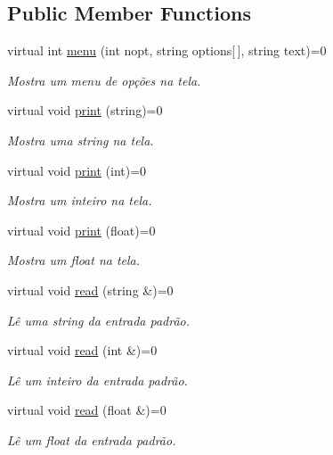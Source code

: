 \subsection*{Public Member Functions}
\begin{DoxyCompactItemize}
\item 
virtual int \hyperlink{classWindow_a3b6d7449c7f088f9ce59002573ca82c0}{menu} (int nopt, string options\mbox{[}$\,$\mbox{]}, string text)=0
\begin{DoxyCompactList}\small\item\em Mostra um menu de opções na tela. \end{DoxyCompactList}\item 
virtual void \hyperlink{classWindow_a4fd86bca046073b3429f221c2f3bb690}{print} (string)=0
\begin{DoxyCompactList}\small\item\em Mostra uma string na tela. \end{DoxyCompactList}\item 
virtual void \hyperlink{classWindow_aa0a1210e72a63332e49722f1f878ea94}{print} (int)=0
\begin{DoxyCompactList}\small\item\em Mostra um inteiro na tela. \end{DoxyCompactList}\item 
virtual void \hyperlink{classWindow_a08f0e967158988de3cf9eb08a7823585}{print} (float)=0
\begin{DoxyCompactList}\small\item\em Mostra um float na tela. \end{DoxyCompactList}\item 
virtual void \hyperlink{classWindow_abb59602c637907250fd70b1450b85c5c}{read} (string \&)=0
\begin{DoxyCompactList}\small\item\em Lê uma string da entrada padrão. \end{DoxyCompactList}\item 
virtual void \hyperlink{classWindow_ab00a4c057aade6ddc2a4bb22b2a6de42}{read} (int \&)=0
\begin{DoxyCompactList}\small\item\em Lê um inteiro da entrada padrão. \end{DoxyCompactList}\item 
virtual void \hyperlink{classWindow_a2a1c43d55946185d0cee7324c78758fc}{read} (float \&)=0
\begin{DoxyCompactList}\small\item\em Lê um float da entrada padrão. \end{DoxyCompactList}\item 

\end{DoxyCompactItemize}
